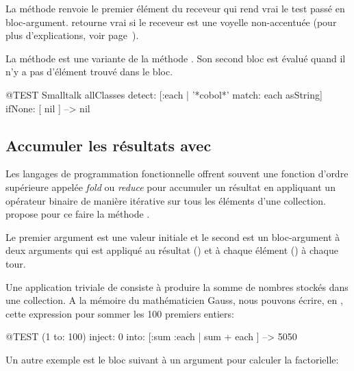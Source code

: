 \documentclass[a4paper,10pt,twoside]{book}
\begin{document}
La méthode  renvoie le premier
élément du receveur qui rend vrai le test passé en bloc-argument.
 retourne vrai \cad {} si le receveur est une
voyelle non-accentuée (pour plus d'explications, voir page~\pageref{def:isVowel}).

La méthode  est une variante de la méthode . 
Son second bloc est évalué quand il n'y a pas d'élément trouvé dans le bloc.

\begin{code}{@TEST}
Smalltalk allClasses detect: [:each | '*cobol*' match: each asString] ifNone: [ nil ] --> nil
\end{code} %

\subsection{Accumuler les résultats avec }
Les langages de programmation fonctionnelle offrent souvent une fonction d'ordre
supérieure appelée \emph{fold} ou \emph{reduce} pour accumuler un résultat
en appliquant un opérateur binaire de manière itérative sur tous les
éléments d'une collection.
\pharo propose pour ce faire la méthode .

Le premier argument est une valeur initiale et le second est un bloc-argument
à deux arguments qui est appliqué au résultat () et à chaque élément () à chaque tour.

Une application triviale de   consiste à produire 
la somme de nombres stockés dans une collection.
A la mémoire du mathématicien Gauss, nous pouvons écrire, en \pharo, cette expression pour sommer les 100 premiers entiers:
\begin{code}{@TEST}
(1 to: 100) inject: 0 into: [:sum :each | sum + each ] --> 5050
\end{code}


Un autre exemple est le bloc suivant à un argument pour calculer la factorielle:
\end{document}
